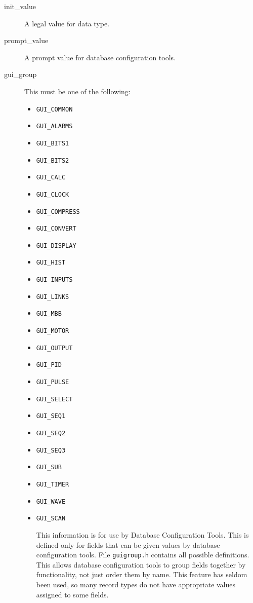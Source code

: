 \begin{description}
\item [init\_value] A legal value for data type.

\item [prompt\_value] A prompt value for database configuration tools.

\item [gui\_group] This must be one of the following:

\begin{itemize}
\item \verb|GUI_COMMON|
\item \verb|GUI_ALARMS|
\item \verb|GUI_BITS1|
\item \verb|GUI_BITS2|
\item \verb|GUI_CALC|
\item \verb|GUI_CLOCK|
\item \verb|GUI_COMPRESS|
\item \verb|GUI_CONVERT|
\item \verb|GUI_DISPLAY|
\item \verb|GUI_HIST|
\item \verb|GUI_INPUTS|
\item \verb|GUI_LINKS|
\item \verb|GUI_MBB|
\item \verb|GUI_MOTOR|
\item \verb|GUI_OUTPUT|
\item \verb|GUI_PID|
\item \verb|GUI_PULSE|
\item \verb|GUI_SELECT|
\item \verb|GUI_SEQ1|
\item \verb|GUI_SEQ2|
\item \verb|GUI_SEQ3|
\item \verb|GUI_SUB|
\item \verb|GUI_TIMER|
\item \verb|GUI_WAVE|
\item \verb|GUI_SCAN|

This information is for use by Database Configuration Tools.
This is defined only for fields that can be given values by database configuration tools.
File \verb|guigroup.h| contains all possible definitions.
This allows database configuration tools to group fields together by functionality, not just order them by name.
This feature has seldom been used, so many record types do not have appropriate values assigned to some fields.


\end{itemize}
\end{description}

